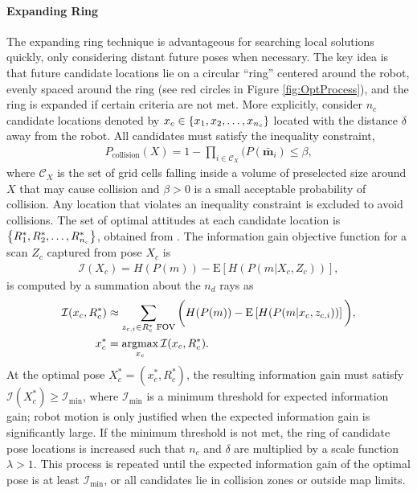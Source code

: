 \paragraph{Expanding Ring}
The expanding ring technique is advantageous for searching local solutions quickly, only considering distant future poses when necessary. The key idea is that future candidate locations lie on a circular ``ring'' centered around the robot, evenly spaced around the ring (see red circles in Figure \ref{fig:OptProcess}), and the ring is expanded if certain criteria are not met. More explicitly, consider $n_c$ candidate locations denoted by $x_c\in\left\{ x_1,x_2,\ldots,x_{n_c} \right\}$ located with the distance $\delta$ away from the robot. All candidates must satisfy the inequality constraint,
\begin{align}
\label{eqn:CollisionInequalityConstraint}
P_\text{collision}(X)=1-\prod_{i\in\mathcal C_X}(P(\bar{\mathbf{m}}_i)\leq\beta,
\end{align}
where $\mathcal C_X$ is the set of grid cells falling inside a volume of preselected size around $X$ that may cause collision and $\beta>0$ is a small acceptable probability of collision. Any location that violates an inequality constraint  is excluded to avoid collisions. The set of optimal attitudes at each candidate location is $\left\{ R^*_{1},R^*_{2},\ldots,R^*_{n_c} \right\}$, obtained from . The information gain objective function for a scan $Z_c$ captured from pose $X_c$ is
\begin{align}
\label{eqn:ObjFun}
\mathcal I(X_c)=H(P(m))-\text{E}\left[H(P(m|X_c,Z_c))\right],
\end{align}
is computed by a summation about the $n_d$ rays as %
\begin{align}
\label{eqn:ObjFunApprox}
\mathcal I(x_c,R_c^*)&\approx \sum_{z_{c,i}\in R_{c}^*\text{ FOV}}\bigg(H(P(m))-\text{E}\left[H(P(m|x_c,z_{c,i}))\right]\bigg),
\\
x_c^*&=\argmax_{x_c}\mathcal I(x_c,R_c^*).
\end{align}
At the optimal pose $X^*_c=(x^*_c,R^*_c)$, the resulting information gain must satisfy $\mathcal I(X_c^*)\geq\mathcal I_\text{min}$, where $\mathcal I_\text{min}$ is a minimum threshold for expected information gain; robot motion is only justified when the expected information gain is significantly large. If the minimum threshold is not met, the ring of candidate pose locations is increased such that $n_c$ and $\delta$ are multiplied by a scale function $\lambda>1$.
This process is repeated until the expected information gain of the optimal pose is at least $\mathcal I_\text{min}$, or all candidates lie in collision zones or outside map limits. %

